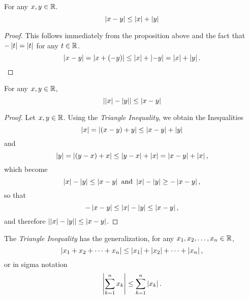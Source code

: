 \begin{cor}
  For any $x, y \in \R$.
  \begin{equation*}
    \abs{x-y} \leq \abs{x}+\abs{y}
  \end{equation*}
  \begin{proof}
    This follows immediately from the proposition above and the fact that $-\abs{t} =
    \abs{t}$ for any $t \in \R$.
    \begin{equation*}
      \abs{x-y} = \abs{x+(-y)} \leq \abs{x}+\abs{-y}= \abs{x}+\abs{y}.
    \end{equation*}
  \end{proof}
\end{cor}
\newpage
\begin{thm}
  For any $x, y \in \R$,
  \begin{equation*}
    \left\lvert \abs{x}-\abs{y}\right\rvert  \leq \abs{x-y}
  \end{equation*}
  \begin{proof}
     Let $x, y \in \R$. Using the \emph{Triangle Inequality}, we obtain the
     Inequalities
     \begin{equation*}
       \abs{x} =\abs{(x-y)+y} \leq \abs{x-y}+\abs{y}
     \end{equation*}
     and
     \begin{equation*}
       \abs{y} = \abs{(y-x)+x} \leq \abs{y-x}+\abs{x} = \abs{x-y}+\abs{x},
     \end{equation*}
     which become
     \begin{equation*}
       \abs{x}-\abs{y} \leq\abs{x-y} \text{ and } \abs{x}-\abs{y} \geq -\abs{x-y},
     \end{equation*}
     so that
     \begin{equation*}
       -\abs{x-y} \leq \abs{x}-\abs{y} \leq \abs{x-y},
     \end{equation*}
     and therefore $\left\lvert \abs{x}-\abs{y}\right\rvert \leq \abs{x-y}$.
  \end{proof}
\end{thm}
The \emph{Triangle Inequality} has the generalization, for any
$x_1,x_2,\ldots,x_n \in \R$,
\begin{equation*}
  \abs{x_1+x_2+\cdots+x_n} \leq \abs{x_1}+\abs{x_2}+\cdots+\abs{x_n},
\end{equation*}
or in sigma notation
\begin{equation*}
  \left\lvert \sum_{k=1}^n x_k\right\rvert \leq \sum_{k=1}^n\abs{x_k}.
\end{equation*}

 
